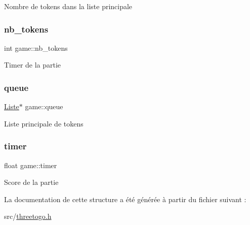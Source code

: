 Nombre de tokens dans la liste principale \mbox{\label{structgame_a68b9c8753fce84f68b88f17fa7737298}} 
\subsubsection{\texorpdfstring{nb\+\_\+tokens}{nb\_tokens}}
{\footnotesize\ttfamily int game\+::nb\+\_\+tokens}

Timer de la partie \mbox{\label{structgame_a9313d74aee727133f1b7929d43ca2bd3}} 
\subsubsection{\texorpdfstring{queue}{queue}}
{\footnotesize\ttfamily \hyperlink{threetogo_8h_a976a52d066ba7588a35e660807a4dd75}{Liste}$\ast$ game\+::queue}

Liste principale de tokens \mbox{\label{structgame_ac6709bdba458183dc12107255e6a8846}} 
\subsubsection{\texorpdfstring{timer}{timer}}
{\footnotesize\ttfamily float game\+::timer}

Score de la partie 

La documentation de cette structure a été générée à partir du fichier suivant \+:\begin{DoxyCompactItemize}
\item 
src/\hyperlink{threetogo_8h}{threetogo.\+h}\end{DoxyCompactItemize}
